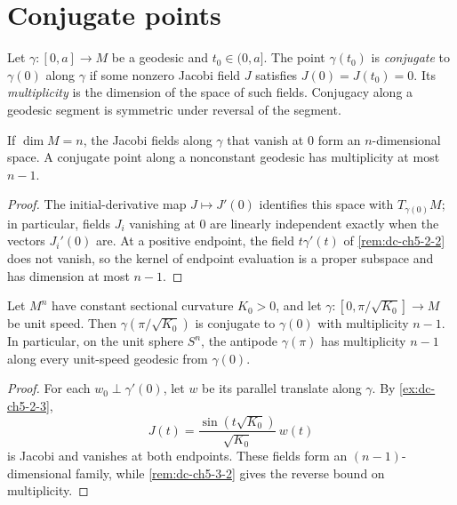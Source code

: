 \section{Conjugate points}

\begin{definition}
  \label{def:dc-ch5-3-1}


  Let $\gamma:[0,a]\to M$ be a geodesic and $t_0\in(0,a]$. The point
  $\gamma(t_0)$ is \emph{conjugate} to $\gamma(0)$ along $\gamma$ if some
  nonzero Jacobi field $J$ satisfies $J(0)=J(t_0)=0$. Its \emph{multiplicity}
  is the dimension of the space of such fields. Conjugacy along a geodesic
  segment is symmetric under reversal of the segment.
\end{definition}

\begin{remark}
  \label{rem:dc-ch5-3-2}

  If $\dim M=n$, the Jacobi fields along $\gamma$ that vanish at $0$ form an
  $n$-dimensional space. A conjugate point along a nonconstant geodesic has
  multiplicity at most $n-1$.
\end{remark}
\begin{proof}

  \sketch
  The initial-derivative map $J\mapsto J'(0)$ identifies this space with
  $T_{\gamma(0)}M$; in particular, fields $J_i$ vanishing at $0$ are linearly
  independent exactly when the vectors $J_i'(0)$ are. At a positive endpoint,
  the field $t\gamma'(t)$ of \cref{rem:dc-ch5-2-2} does not vanish, so the kernel
  of endpoint evaluation is a proper subspace and has dimension at most $n-1$.
\end{proof}

\begin{example}
  \label{ex:dc-ch5-3-3}


  Let $M^n$ have constant sectional curvature $K_0>0$, and let
  $\gamma:[0,\pi/\sqrt{K_0}]\to M$ be unit speed. Then
  $\gamma(\pi/\sqrt{K_0})$ is conjugate to $\gamma(0)$ with multiplicity $n-1$.
  In particular, on the unit sphere $S^n$, the antipode $\gamma(\pi)$ has
  multiplicity $n-1$ along every unit-speed geodesic from $\gamma(0)$.
\end{example}
\begin{proof}

  \sketch
  For each $w_0\perp\gamma'(0)$, let $w$ be its parallel translate along
  $\gamma$. By \cref{ex:dc-ch5-2-3},
  $$
  J(t)=\frac{\sin(t\sqrt{K_0})}{\sqrt{K_0}}\,w(t)
  $$
  is Jacobi and vanishes at both endpoints. These fields form an
  $(n-1)$-dimensional family, while \cref{rem:dc-ch5-3-2} gives the reverse
  bound on multiplicity.
\end{proof}

